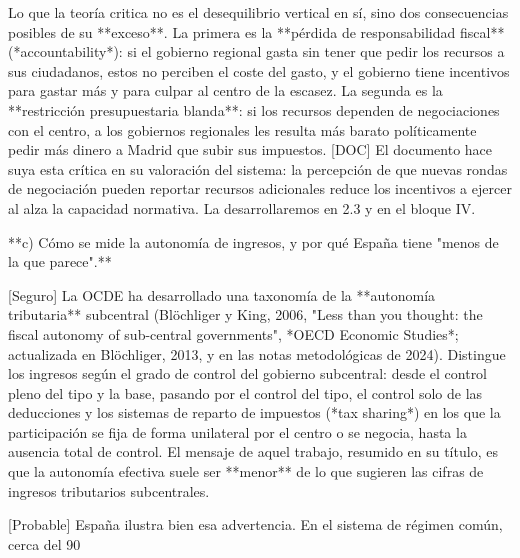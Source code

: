 \documentclass[10pt,a4paper]{article}
\begin{document}
Lo que la teoría critica no es el desequilibrio vertical en sí, sino dos consecuencias posibles de su **exceso**. La primera es la **pérdida de responsabilidad fiscal** (*accountability*): si el gobierno regional gasta sin tener que pedir los recursos a sus ciudadanos, estos no perciben el coste del gasto, y el gobierno tiene incentivos para gastar más y para culpar al centro de la escasez. La segunda es la **restricción presupuestaria blanda**: si los recursos dependen de negociaciones con el centro, a los gobiernos regionales les resulta más barato políticamente pedir más dinero a Madrid que subir sus impuestos. [DOC] El documento hace suya esta crítica en su valoración del sistema: la percepción de que nuevas rondas de negociación pueden reportar recursos adicionales reduce los incentivos a ejercer al alza la capacidad normativa. La desarrollaremos en 2.3 y en el bloque IV.

**c) Cómo se mide la autonomía de ingresos, y por qué España tiene "menos de la que parece".**

[Seguro] La OCDE ha desarrollado una taxonomía de la **autonomía tributaria** subcentral (Blöchliger y King, 2006, "Less than you thought: the fiscal autonomy of sub-central governments", *OECD Economic Studies*; actualizada en Blöchliger, 2013, y en las notas metodológicas de 2024). Distingue los ingresos según el grado de control del gobierno subcentral: desde el control pleno del tipo y la base, pasando por el control del tipo, el control solo de las deducciones y los sistemas de reparto de impuestos (*tax sharing*) en los que la participación se fija de forma unilateral por el centro o se negocia, hasta la ausencia total de control. El mensaje de aquel trabajo, resumido en su título, es que la autonomía efectiva suele ser **menor** de lo que sugieren las cifras de ingresos tributarios subcentrales.

[Probable] España ilustra bien esa advertencia. En el sistema de régimen común, cerca del 90%
\end{document}
